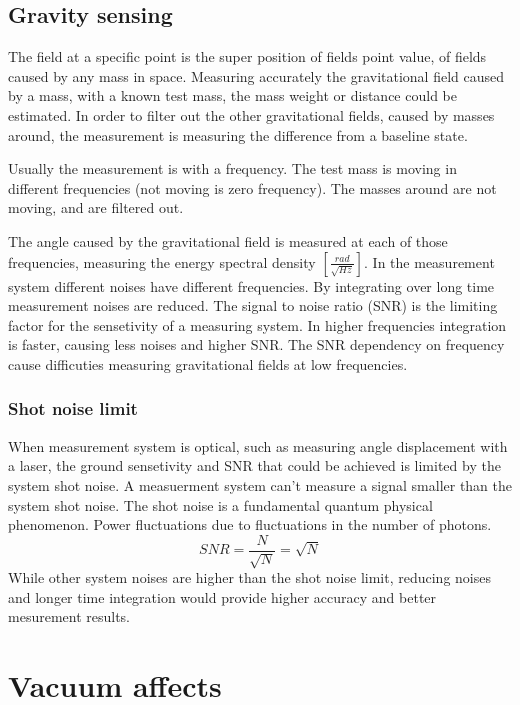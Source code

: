 \documentclass[\main/master.tex]{subfiles}
\begin{document}
\subsection{Gravity sensing}
The field at a specific point is the super position of fields point value, of fields caused by any mass in space. Measuring accurately the gravitational field caused by a mass, with a known test mass, the mass weight or distance could be estimated. In order to filter out the other gravitational fields, caused by masses around, the measurement is measuring the difference from a baseline state.
\par
Usually the measurement is with a frequency. The test mass is moving in different frequencies (not moving is zero frequency). The masses around are not moving, and are filtered out.
\par
The angle caused by the gravitational field is measured at each of those frequencies, measuring the energy spectral density $[\frac{rad}{\sqrt{Hz}}]$.
In the measurement system different noises have different frequencies. By integrating over long time measurement noises are reduced. The signal to noise ratio (SNR) is the limiting factor for the sensetivity of a measuring system. In higher frequencies integration is faster, causing less noises and higher SNR.
The SNR dependency on frequency cause difficuties measuring gravitational fields at low frequencies.

\subsubsection{Shot noise limit}
When measurement system is optical, such as measuring angle displacement with a laser, the ground sensetivity and SNR that could be achieved is limited by the system shot noise. A measuerment system can't measure a signal smaller than the system shot noise. The shot noise is a fundamental quantum physical phenomenon. Power fluctuations due to fluctuations in the number of photons. 
\begin{equation}
SNR = \frac{N}{\sqrt{N}} = \sqrt{N}    \label{eqn:shot_noise}
\end{equation}
While other system noises are higher than the shot noise limit, reducing noises and longer time integration would provide higher accuracy and better mesurement results. 


\section{Vacuum affects}
\end{document}
